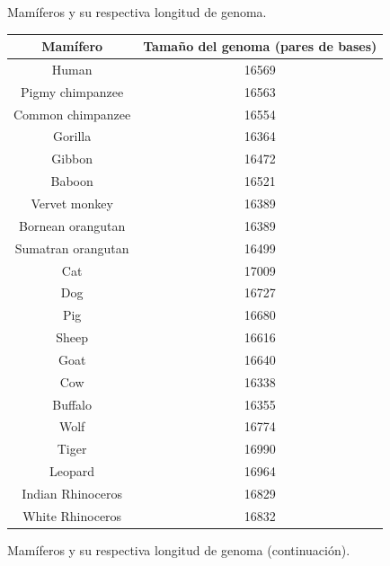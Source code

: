 \documentclass[12pt]{article}
\begin{document}
\begin{center}
  Mamíferos y su respectiva longitud de genoma.
  
  \vspace{3mm}
  \begin{tabular}{| c | c |}
    \hline
    \cellcolor{gray}Mamífero & \cellcolor{gray}Tamaño del genoma (pares de bases) \\\hline
    Human & 16569 \\\hline
    \cellcolor{lightgray}Pigmy chimpanzee & \cellcolor{lightgray}16563 \\\hline
    Common chimpanzee & 16554 \\\hline
    \cellcolor{lightgray}Gorilla & \cellcolor{lightgray}16364 \\\hline
    Gibbon & 16472 \\\hline
    \cellcolor{lightgray}Baboon & \cellcolor{lightgray}16521 \\\hline
    Vervet monkey & 16389 \\\hline
    \cellcolor{lightgray}Bornean orangutan & \cellcolor{lightgray}16389 \\\hline
    Sumatran orangutan & 16499 \\\hline
    \cellcolor{lightgray}Cat & \cellcolor{lightgray}17009 \\\hline
    Dog & 16727 \\\hline
    \cellcolor{lightgray}Pig & \cellcolor{lightgray}16680 \\\hline
    Sheep & 16616 \\\hline
    \cellcolor{lightgray}Goat & \cellcolor{lightgray}16640 \\\hline
    Cow & 16338 \\\hline
    \cellcolor{lightgray}Buffalo & \cellcolor{lightgray}16355 \\\hline
    Wolf & 16774 \\\hline
    \cellcolor{lightgray}Tiger & \cellcolor{lightgray}16990 \\\hline
    Leopard & 16964 \\\hline
    \cellcolor{lightgray}Indian Rhinoceros & \cellcolor{lightgray}16829 \\\hline
    White Rhinoceros & 16832 \\\hline
  \end{tabular}
  \newpage

  Mamíferos y su respectiva longitud de genoma (continuación).
  

\end{center}
\end{document}
